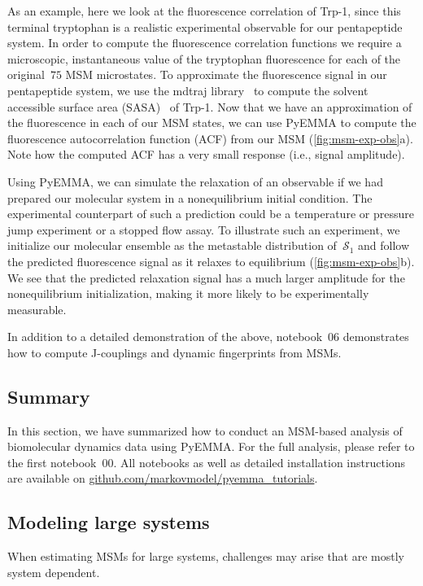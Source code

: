 \documentclass[9pt,tutorial]{livecoms}
\newcommand{\githubrepository}{\url{github.com/markovmodel/pyemma_tutorials}}
\begin{document}
As an example, here we look at the fluorescence correlation of Trp-1,
since this terminal tryptophan is a realistic experimental observable for our pentapeptide system.
In order to compute the fluorescence correlation functions we require a microscopic,
instantaneous value of the tryptophan fluorescence for each of the original~$75$ MSM microstates.
To approximate the fluorescence signal in our pentapeptide system,
we use the mdtraj library~\cite{mdtraj} to compute the solvent accessible surface area (SASA)~\cite{sasa-calculation} of Trp-1.
Now that we have an approximation of the fluorescence in each of our MSM states,
we can use PyEMMA to compute the fluorescence autocorrelation function (ACF) from our MSM (\ref{fig:msm-exp-obs}a).
Note how the computed ACF has a very small response (i.e., signal amplitude).

Using PyEMMA, we can simulate the relaxation of an observable if we had prepared our molecular system in a nonequilibrium initial condition.
The experimental counterpart of such a prediction could be a temperature or pressure jump experiment or a stopped flow assay.
To illustrate such an experiment, we initialize our molecular ensemble as the metastable distribution of~$\mathcal{S}_1$
and follow the predicted fluorescence signal as it relaxes to equilibrium (\ref{fig:msm-exp-obs}b).
We see that the predicted relaxation signal has a much larger amplitude for the nonequilibrium initialization,
making it more likely to be experimentally measurable.

In addition to a detailed demonstration of the above, notebook~06 demonstrates how to compute J-couplings and dynamic fingerprints from MSMs.

\subsection{Summary}

In this section, we have summarized how to conduct an MSM-based analysis of biomolecular dynamics data using PyEMMA.
For the full analysis, please refer to the first notebook~00.
All notebooks as well as detailed installation instructions are available on \githubrepository{}.

\subsection{Modeling large systems}

When estimating MSMs for large systems, challenges may arise that are mostly system dependent.
\end{document}
